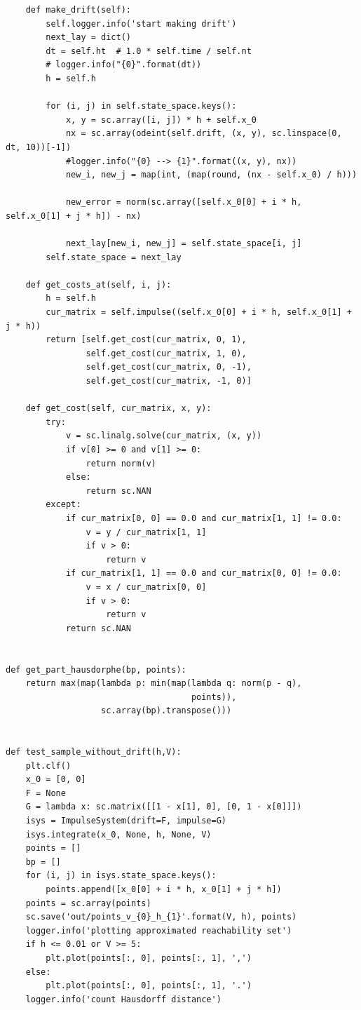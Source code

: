 \documentclass[a4paper,12pt]{article}
\begin{document}
\begin{verbatim}
    def make_drift(self):
        self.logger.info('start making drift')
        next_lay = dict()
        dt = self.ht  # 1.0 * self.time / self.nt
        # logger.info("{0}".format(dt))
        h = self.h

        for (i, j) in self.state_space.keys():
            x, y = sc.array([i, j]) * h + self.x_0
            nx = sc.array(odeint(self.drift, (x, y), sc.linspace(0, dt, 10))[-1])
            #logger.info("{0} --> {1}".format((x, y), nx))
            new_i, new_j = map(int, (map(round, (nx - self.x_0) / h)))

            new_error = norm(sc.array([self.x_0[0] + i * h, self.x_0[1] + j * h]) - nx)

            next_lay[new_i, new_j] = self.state_space[i, j]
        self.state_space = next_lay

    def get_costs_at(self, i, j):
        h = self.h
        cur_matrix = self.impulse((self.x_0[0] + i * h, self.x_0[1] + j * h))
        return [self.get_cost(cur_matrix, 0, 1),
                self.get_cost(cur_matrix, 1, 0),
                self.get_cost(cur_matrix, 0, -1),
                self.get_cost(cur_matrix, -1, 0)]

    def get_cost(self, cur_matrix, x, y):
        try:
            v = sc.linalg.solve(cur_matrix, (x, y))
            if v[0] >= 0 and v[1] >= 0:
                return norm(v)
            else:
                return sc.NAN
        except:
            if cur_matrix[0, 0] == 0.0 and cur_matrix[1, 1] != 0.0:
                v = y / cur_matrix[1, 1]
                if v > 0:
                    return v
            if cur_matrix[1, 1] == 0.0 and cur_matrix[0, 0] != 0.0:
                v = x / cur_matrix[0, 0]
                if v > 0:
                    return v
            return sc.NAN


def get_part_hausdorphe(bp, points):
    return max(map(lambda p: min(map(lambda q: norm(p - q),
                                     points)),
                   sc.array(bp).transpose()))


def test_sample_without_drift(h,V):
    plt.clf()
    x_0 = [0, 0]
    F = None
    G = lambda x: sc.matrix([[1 - x[1], 0], [0, 1 - x[0]]])
    isys = ImpulseSystem(drift=F, impulse=G)
    isys.integrate(x_0, None, h, None, V)
    points = []
    bp = []
    for (i, j) in isys.state_space.keys():
        points.append([x_0[0] + i * h, x_0[1] + j * h])
    points = sc.array(points)
    sc.save('out/points_v_{0}_h_{1}'.format(V, h), points)
    logger.info('plotting approximated reachability set')
    if h <= 0.01 or V >= 5:
        plt.plot(points[:, 0], points[:, 1], ',')
    else:
        plt.plot(points[:, 0], points[:, 1], '.')
    logger.info('count Hausdorff distance')


\end{verbatim}
\end{document}
